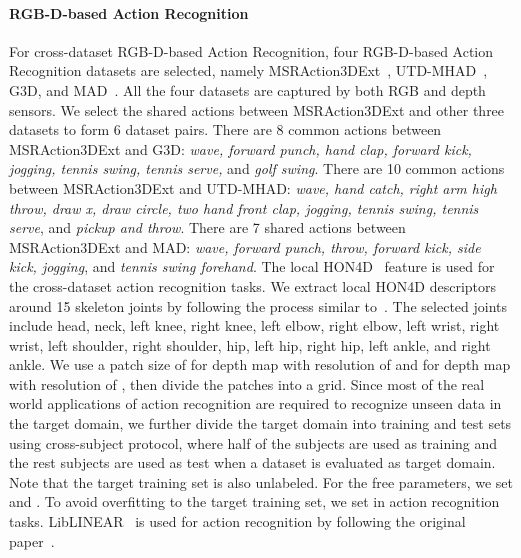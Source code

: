 \documentclass[10pt,twocolumn,letterpaper]{article}
\begin{document}
\paragraph{RGB-D-based Action Recognition}
For cross-dataset RGB-D-based Action Recognition, four RGB-D-based Action Recognition datasets are selected, namely MSRAction3DExt~\cite{Li2010,Wang2016}, UTD-MHAD~\cite{Chen2015b}, G3D\cite{Bloom2012}, and MAD~\cite{Huang2014}. All the four datasets are captured by both RGB and depth sensors. We select the shared actions between MSRAction3DExt and other three datasets to form 6 dataset pairs. There are 8 common actions between MSRAction3DExt and G3D: \textit{wave, forward punch, hand clap, forward kick, jogging, tennis swing, tennis serve,} and \textit{golf swing}. There are 10 common actions between MSRAction3DExt and UTD-MHAD: \textit{wave, hand catch, right arm high throw, draw x, draw circle, two hand front clap, jogging, tennis swing, tennis serve}, and \textit{pickup and throw}. There are 7 shared actions between MSRAction3DExt and MAD: \textit{wave, forward punch, throw, forward kick, side kick, jogging}, and \textit{tennis swing forehand}. The local HON4D~\cite{Oreifej2013} feature is used for the cross-dataset action recognition tasks. We extract local HON4D descriptors around 15 skeleton joints by following the process similar to~\cite{Oreifej2013}. The selected joints include head, neck, left knee, right knee, left elbow, right elbow, left wrist, right wrist, left shoulder, right shoulder, hip, left hip, right hip, left ankle, and right ankle. We use a patch size of  for depth map with resolution of  and  for depth map with resolution of 
, then divide the patches into a  grid. 
Since most of the real world applications of action recognition are required to recognize unseen data in the target domain, we further divide the target domain into training and test sets using cross-subject protocol, where half of the subjects are used as training and the rest subjects are used as test when a dataset is evaluated as target domain. Note that the target training set is also unlabeled. For the free parameters, we set  and . To avoid overfitting to the target training set, we set  in action recognition tasks. LibLINEAR~\cite{Fan2008} is used for action recognition by following the original paper~\cite{Oreifej2013}. 

\vspace{-1.5em}
\end{document}
